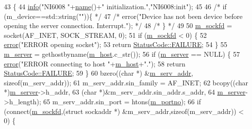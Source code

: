 \begin{DoxyCode}
43                     \{
44     \hyperlink{classObject_a644fd329ea4cb85f54fa6846484b84a8}{info}(\textcolor{stringliteral}{"NI6008 "}+\hyperlink{classObject_a300f4c05dd468c7bb8b3c968868443c1}{name}()+\textcolor{stringliteral}{" initialization."},\textcolor{stringliteral}{"NI6008:init"});    
45 
46     \textcolor{comment}{/* if (m\_device==std::string(""))\{ */}
47     \textcolor{comment}{/*   error("Device has not been device before opening the server connection. Interrupt."); */}
48     \textcolor{comment}{/* \} */}
49 
50     \hyperlink{classNI6008_aa1ca2ab973aaceac58d9d17e482682b5}{m\_sockfd} = socket(AF\_INET, SOCK\_STREAM, 0);
51     \textcolor{keywordflow}{if} (\hyperlink{classNI6008_aa1ca2ab973aaceac58d9d17e482682b5}{m\_sockfd} < 0) \{
52       \hyperlink{classObject_a204a95f57818c0f811933917a30eff45}{error}(\textcolor{stringliteral}{"ERROR opening socket"});
53       \textcolor{keywordflow}{return} \hyperlink{classStatusCode_a6f565cbeadc76d14c72f047e5e85eb4ba3da73d4c469762eb9d3c960368252b26}{StatusCode::FAILURE};
54     \}
55     \hyperlink{classNI6008_a789147ad3c7b66da3548a10a109f8cab}{m\_server} = gethostbyname(\hyperlink{classNI6008_ab8b247caa89b1dc9b9c78b0c1b08ed5d}{m\_host}.c\_str());
56     \textcolor{keywordflow}{if} (\hyperlink{classNI6008_a789147ad3c7b66da3548a10a109f8cab}{m\_server} == NULL) \{
57       \hyperlink{classObject_a204a95f57818c0f811933917a30eff45}{error}(\textcolor{stringliteral}{"ERROR connecting to host "}+\hyperlink{classNI6008_ab8b247caa89b1dc9b9c78b0c1b08ed5d}{m\_host}+\textcolor{stringliteral}{"."});
58       \textcolor{keywordflow}{return} \hyperlink{classStatusCode_a6f565cbeadc76d14c72f047e5e85eb4ba3da73d4c469762eb9d3c960368252b26}{StatusCode::FAILURE};
59     \}
60     bzero((\textcolor{keywordtype}{char} *) &\hyperlink{classNI6008_a5bc7b74f001b1d5a3934d58eadb0b3fa}{m\_serv\_addr}, \textcolor{keyword}{sizeof}(m\_serv\_addr));
61     m\_serv\_addr.sin\_family = AF\_INET;
62     bcopy((\textcolor{keywordtype}{char} *)\hyperlink{classNI6008_a789147ad3c7b66da3548a10a109f8cab}{m\_server}->h\_addr, 
63           (\textcolor{keywordtype}{char} *)&m\_serv\_addr.sin\_addr.s\_addr,
64           \hyperlink{classNI6008_a789147ad3c7b66da3548a10a109f8cab}{m\_server}->h\_length);
65     m\_serv\_addr.sin\_port = htons(\hyperlink{classNI6008_aabb914d00c938a12e99c1078f40fb104}{m\_portno});
66     \textcolor{keywordflow}{if} (connect(\hyperlink{classNI6008_aa1ca2ab973aaceac58d9d17e482682b5}{m\_sockfd},(\textcolor{keyword}{struct} sockaddr *) &m\_serv\_addr,\textcolor{keyword}{sizeof}(m\_serv\_addr)) < 0) \{

\end{DoxyCode}
